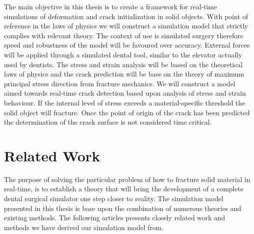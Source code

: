 The main objective in this thesis is to create a framework for
real-time simulations of deformation and crack initialization in solid
objects. 
%
With point of reference in the laws of physics we will
construct a simulation model that strictly complies with relevant
theory. The context of use is simulated surgery therefore speed
and robustness of the model will be favoured over accuracy.
%
External forces will be applied through a simulated dental tool, similar
to the elevator actually used by dentists. 
%
The stress and strain analysis will be based on 
the theoretical laws of physics and the crack prediction will be base on
the theory of maximum principal stress direction from fracture mechanics. 
%
We will construct a model aimed towards real-time crack detection
based upon analysis of stress and strain behaviour. If the
internal level of stress exceeds a material-specific threshold the
solid object will fracture. Once the point of origin of the crack has
been predicted the determination of the crack surface is not
considered time critical.







\section{Related Work}
The purpose of solving the particular problem of how to
fracture solid material in real-time, is to establish a theory 
that will bring the development of a complete dental surgical
simulator one step closer to reality. The simulation model presented
in this thesis is base upon the combination of numerous theories and
existing methods. 
%
The following articles presents closely related work and methods
we have derived our simulation model from. \\

